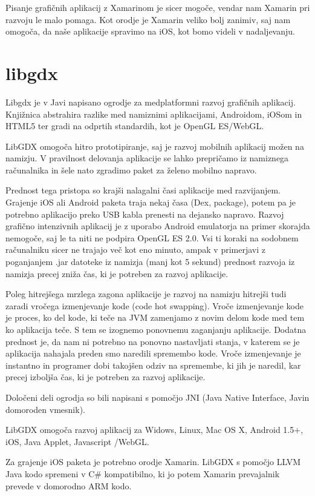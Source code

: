 Pisanje grafičnih aplikacij z Xamarinom je sicer mogoče, vendar nam Xamarin pri razvoju le malo pomaga. Kot orodje je Xamarin veliko bolj zanimiv, saj nam omogoča, da naše aplikacije spravimo na iOS, kot bomo videli v nadaljevanju.

\section{libgdx}
\label{sec:libgdx}
Libgdx\cite{libgdx} je v Javi napisano ogrodje za medplatformni razvoj grafičnih aplikacij. Knjižnica abstrahira razlike med namiznimi aplikacijami, Androidom, iOSom in HTML5 ter gradi na odprtih standardih, kot je OpenGL ES/WebGL.

LibGDX omogoča hitro prototipiranje, saj je razvoj mobilnih aplikacij možen na namizju. V pravilnost delovanja aplikacije se lahko prepričamo iz namiznega računalnika in šele nato zgradimo paket za želeno mobilno napravo. 

Prednost tega pristopa so krajši nalagalni časi aplikacije med razvijanjem. Grajenje iOS ali Android paketa traja nekaj časa (Dex, package), potem pa je potrebno aplikacijo preko USB kabla prenesti na dejansko napravo. Razvoj grafično intenzivnih aplikacij je z uporabo Android emulatorja na primer skorajda nemogoče, saj le ta niti ne podpira OpenGL ES 2.0. Vsi ti koraki na sodobnem računalniku sicer ne trajajo več kot eno minuto, ampak v primerjavi z poganjanjem .jar datoteke iz namizja (manj kot 5 sekund) prednost razvoja iz namizja precej zniža čas, ki je potreben za razvoj aplikacije.

Poleg hitrejšega mrzlega zagona aplikacije je razvoj na namizju hitrejši tudi zaradi vročega izmenjevanje kode (code hot swapping). Vroče izmenjevanje kode je proces, ko del kode, ki teče na JVM zamenjamo z novim delom kode med tem ko aplikacija teče. S tem se izognemo ponovnemu zaganjanju aplikacije. Dodatna prednost je, da nam ni potrebno na ponovno nastavljati stanja, v katerem se je aplikacija nahajala preden smo naredili spremembo kode. Vroče izmenjevanje je instantno in programer dobi takojšen odziv na spremembe, ki jih je naredil, kar precej izboljša čas, ki je potreben za razvoj aplikacije.

Določeni deli ogrodja so bili napisani s pomočjo JNI (Java Native Interface, Javin domoroden vmesnik).

LibGDX omogoča razvoj aplikacij za Widows, Linux, Mac OS X, Android 1.5+, iOS, Java Applet, Javascript /WebGL. 

Za grajenje iOS paketa je potrebno orodje Xamarin. LibGDX s pomočjo LLVM Java kodo spremeni v C\# kompatibilno, ki jo potem Xamarin prevajalnik prevede v domorodno ARM kodo.

